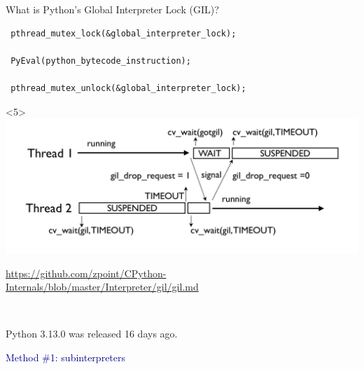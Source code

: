 \documentclass[aspectratio=169]{beamer}
\begin{document}
\begin{frame}[fragile]{What is Python's Global Interpreter Lock (GIL)?}
\begin{onlyenv}
\vspace{0.5 cm}
\begin{verbatim}
 pthread_mutex_lock(&global_interpreter_lock);

 PyEval(python_bytecode_instruction);

 pthread_mutex_unlock(&global_interpreter_lock);
\end{verbatim}
\end{onlyenv}\begin{onlyenv}<5>
\includegraphics[width=\linewidth]{img/new_gil.png}

\normalsize
\textcolor{blue}{\url{https://github.com/zpoint/CPython-Internals/blob/master/Interpreter/gil/gil.md}}
\end{onlyenv}
\end{frame}

\begin{frame}{\mbox{ }}
\Large
\vspace{0.5 cm}
\begin{center}
Python 3.13.0 was released 16 days ago.

\vspace{1 cm}
\end{center}
\end{frame}

\begin{frame}
\vspace{1 cm}
\LARGE
\begin{center}
\textcolor{darkblue}{Method \#1: subinterpreters}
\end{center}
\end{frame}
\end{document}
